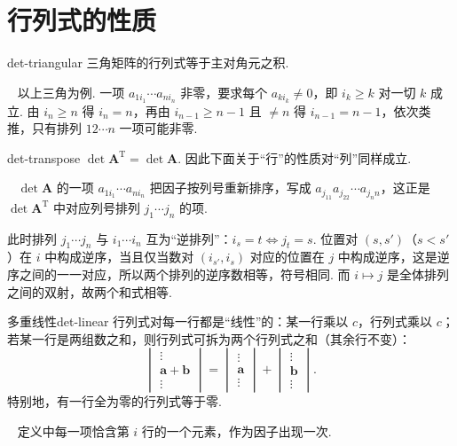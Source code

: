 \documentclass[lang=cn,10.5pt,scheme=chinese,toc=twocol,section,chinesefont=nofont,
twoside,citestyle=gb7714-2015,bibstyle=gb7714-2015]{elegantbook}
\newcommand{\vv}[1]{\boldsymbol{#1}}
\newcommand{\trans}{\mathrm{T}}             %
\numberwithin{equation}{section}   %
\newcommand*{\lnlabel}[1]{{\sffamily\bfseries\color{black}#1}}
\renewenvironment{proof}{%
	\par\noindent\lnlabel{\proofname}\;\ \color{black!90}\cfs}{\par}
\begin{document}
\section{行列式的性质}

\begin{dprop}{}{det-triangular}
  三角矩阵的行列式等于主对角元之积.
\end{dprop}
\begin{proof}
  以上三角为例. 一项 $a_{1i_1}\cdots a_{ni_n}$ 非零，要求每个 $a_{ki_k}\ne0$，即 $i_k\ge k$ 对一切 $k$ 成立. 由 $i_n\ge n$ 得 $i_n=n$，再由 $i_{n-1}\ge n-1$ 且 $\ne n$ 得 $i_{n-1}=n-1$，依次类推，只有排列 $12\cdots n$ 一项可能非零.
\end{proof}

\begin{dprop}{}{det-transpose}
  $\det\vv A^\trans=\det\vv A$. 因此下面关于“行”的性质对“列”同样成立.
\end{dprop}
\begin{proof}
  $\det\vv A$ 的一项 $a_{1i_1}\cdots a_{ni_n}$ 把因子按列号重新排序，写成 $a_{j_11}a_{j_22}\cdots a_{j_nn}$，这正是 $\det\vv A^\trans$ 中对应列号排列 $j_1\cdots j_n$ 的项.

  此时排列 $j_1\cdots j_n$ 与 $i_1\cdots i_n$ 互为“逆排列”：$i_s=t\iff j_t=s$. 位置对 $(s,s')$（$s<s'$）在 $i$ 中构成逆序，当且仅当数对 $(i_{s'},i_s)$ 对应的位置在 $j$ 中构成逆序，这是逆序之间的一一对应，所以两个排列的逆序数相等，符号相同. 而 $i\mapsto j$ 是全体排列之间的双射，故两个和式相等.
\end{proof}

\begin{dprop}{多重线性}{det-linear}
  行列式对每一行都是“线性”的：某一行乘以 $c$，行列式乘以 $c$；若某一行是两组数之和，则行列式可拆为两个行列式之和（其余行不变）：
  \[
    \begin{vmatrix}
      \vdots \\ \vv a+\vv b\\ \vdots
    \end{vmatrix}
    =
    \begin{vmatrix}
      \vdots \\ \vv a\\ \vdots
    \end{vmatrix}
    +
    \begin{vmatrix}
      \vdots \\ \vv b\\ \vdots
    \end{vmatrix}
    .
  \]
  特别地，有一行全为零的行列式等于零.
\end{dprop}
\begin{proof}
  定义中每一项恰含第 $i$ 行的一个元素，作为因子出现一次.
\end{proof}
\end{document}
